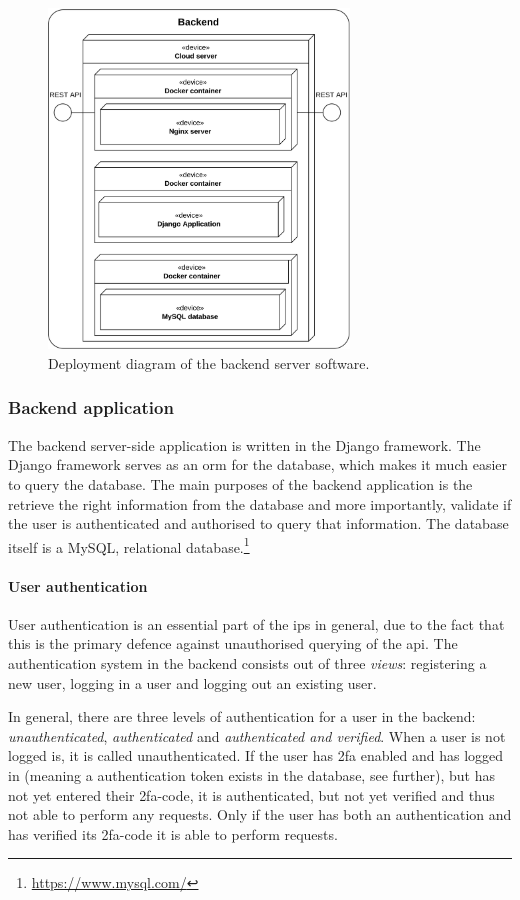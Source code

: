 \begin{figure}[htp]
    \centering
    \includegraphics[width=8cm]{images/deployment_diagram_backend.drawio.png}
    \caption{Deployment diagram of the backend server software.}
    \label{fig:deployment-backend}
\end{figure}


\subsubsection{Backend application}\label{sec:backend-application}
The backend server-side application is written in the Django framework. The Django framework serves as an \ac{orm} for the database, which makes it much easier to query the database. The main purposes of the backend application is the retrieve the right information from the database and more importantly, validate if the user is authenticated and authorised to query that information. The database itself is a MySQL, relational database.\footnote{\url{https://www.mysql.com/}} 


\paragraph{User authentication}\label{sec:user-authentication}
User authentication is an essential part of the \ac{ips} in general, due to the fact that this is the primary defence against unauthorised querying of the \ac{api}. The authentication system in the backend consists out of three \textit{views}: registering a new user, logging in a user and logging out an existing user. 

\ind In general, there are three levels of authentication for a user in the backend: \textit{unauthenticated}, \textit{authenticated} and \textit{authenticated and verified}. When a user is not logged is, it is called unauthenticated. If the user has \ac{2fa} enabled and has logged in (meaning a authentication token exists in the database, see further), but has not yet entered their \ac{2fa}-code, it is authenticated, but not yet verified and thus not able to perform any requests. Only if the user has both an authentication and has verified its \ac{2fa}-code it is able to perform requests.

